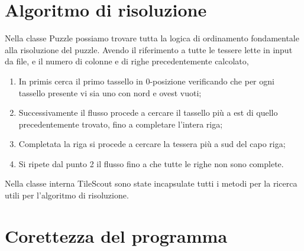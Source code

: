\documentclass[a4paper]{article}
\begin{document}
\section{Algoritmo di risoluzione}
Nella classe Puzzle possiamo trovare tutta la logica di ordinamento fondamentale alla risoluzione del puzzle. Avendo il riferimento a tutte le tessere lette in input da file, e il numero di colonne e di righe precedentemente calcolato,
\begin{enumerate}
\item In primis cerca il primo tassello in 0-posizione verificando che per ogni tassello presente vi sia uno con nord e ovest vuoti;
\item Successivamente il flusso procede a cercare il tassello più a est di quello precedentemente trovato, fino a completare l'intera riga;
\item Completata la riga si procede a cercare la tessera più a sud del capo riga;
\item Si ripete dal punto 2 il flusso fino a che tutte le righe non sono complete.
\end{enumerate}   
Nella classe interna TileScout sono state incapsulate tutti i metodi per la ricerca utili per l'algoritmo di risoluzione.

\section{Corettezza del programma}
\end{document}
